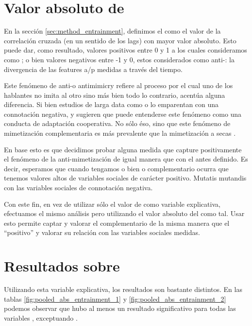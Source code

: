 

\section{Valor absoluto de \entrainment}

En la sección \ref{sec:method_entrainment}, definimos el \entrainment como el valor de la correlación cruzada (en un sentido de los lags) con mayor valor absoluto. Esto puede dar, como resultado, valores positivos entre 0 y 1 a los cuales consideramos como \entrainment; o bien valores negativos entre -1 y 0, estos considerados como anti-\entrainment: la divergencia de las features a/p medidas a través del tiempo.

Este fenómeno de anti-\entrainment o antimimicry \cite{CHAR1999} refiere al proceso por el cual uno de los hablantes no imita al otro sino más bien todo lo contrario, acentúa alguna diferencia. Si bien estudios de larga data como \cite{bourhis1973language} o \cite{dabbs1969similarity} lo emparentan con una connotación negativa, \cite{healey2014divergence} y \cite{levitan2015acoustic} sugieren que puede entenderse este fenómeno como una conducta de adaptación cooperativa. No sólo éso, sino que este fenómeno de mimetización complementaria es más prevalente que la mimetización a secas \cite{levitan2015acoustic}.

En base esto es que decidimos probar alguna medida que capture positivamente el fenómeno de la anti-mimetización de igual manera que con el \entrainment antes definido. Es decir, esperamos que cuando tengamos o bien \entrainment o \entrainment complementario ocurra que tenemos valores altos de variables sociales de carácter positivo. Mutatis mutandis con las variables sociales de connotación negativa.

Con este fin, en vez de utilizar sólo el valor de \entrainment como variable explicativa, efectuamos el mismo análisis pero utilizando el valor absoluto del \entrainment como tal. Usar esto permite captar y valorar el \entrainment complementario de la misma manera que el ``positivo'' y valorar su relación con las variables sociales medidas.

\section{Resultados sobre \absentrainment}

Utilizando esta variable explicativa, los resultados son bastante distintos. En las tablas \ref{fig:pooled_abs_entrainment_1} y \ref{fig:pooled_abs_entrainment_2} podemos observar que hubo al menos un resultado significativo para todas las variables \ap, exceptuando \PHONAVG.

